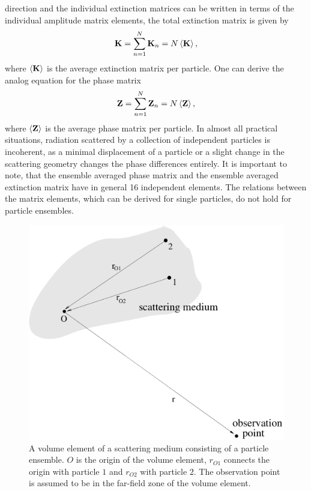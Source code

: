 direction and the individual extinction matrices can be written in
terms of the individual amplitude matrix elements, the total
extinction matrix is given by
\begin{equation}
  \label{eq:rtetheory:ext_mat_tot}
  {\bf K} = \sum_{n=1}^N  \mathbf{K}_n = N \left\langle {\bf K} \right\rangle,
\end{equation}
where $\left\langle {\bf K} \right\rangle$ is the average extinction matrix per
particle. One can derive the analog equation for the phase matrix
 \begin{equation}
  \label{eq:rtetheory:pha_mat_tot}
  {\bf Z} = \sum_{n=1}^N  \mathbf{Z}_n = N \left\langle {\bf Z} \right\rangle,
\end{equation}
where $\left\langle {\bf Z} \right\rangle$ is the average phase matrix per particle.  In
almost all practical situations, radiation scattered by a collection
of independent particles is incoherent, as a minimal displacement of a
particle or a slight change in the scattering geometry changes the
phase differences entirely.  It is important to note, that the
ensemble averaged phase matrix and the ensemble averaged extinction
matrix have in general 16 independent elements. The relations between
the matrix elements, which can be derived for single particles, do not
hold for particle ensembles.

\begin{figure}[t]
 \begin{center}
   \includegraphics*[width=0.6\hsize]{part_ensemble}
   \caption{A volume element of a scattering medium consisting of a particle
ensemble. $O$ is the origin of the volume element, $r_{O1}$ connects the origin
with particle $1$ and $r_{O2}$ with particle $2$. The observation point is
assumed to be in the far-field zone of the volume element.}
  \label{fig:part_ensembles}  
 \end{center}
\end{figure}


